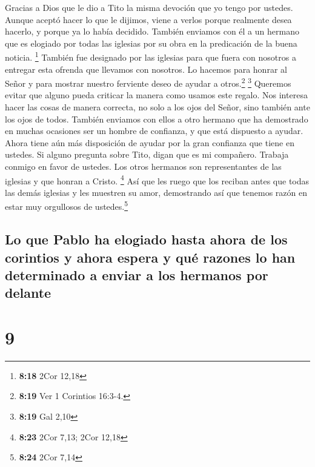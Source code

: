  Gracias a Dios que le dio a Tito la misma devoción que
yo tengo por ustedes.  Aunque aceptó hacer lo que le
dijimos, viene a verlos porque realmente desea hacerlo, y porque ya lo
había decidido.  También enviamos con él a un hermano que
es elogiado por todas las iglesias por su obra en la predicación de la
buena noticia. \footnote{\textbf{8:18} 2Cor 12,18} 
También fue designado por las iglesias para que fuera con nosotros a
entregar esta ofrenda que llevamos con nosotros. Lo hacemos para honrar
al Señor y para mostrar nuestro ferviente deseo de ayudar a
otros.\footnote{\textbf{8:19} Ver 1 Corintios 16:3-4.} \footnote{\textbf{8:19}
  Gal 2,10}  Queremos evitar que alguno pueda criticar la
manera como usamos este regalo.  Nos interesa hacer las
cosas de manera correcta, no solo a los ojos del Señor, sino también
ante los ojos de todos.  También enviamos con ellos a
otro hermano que ha demostrado en muchas ocasiones ser un hombre de
confianza, y que está dispuesto a ayudar. Ahora tiene aún más
disposición de ayudar por la gran confianza que tiene en ustedes.
 Si alguno pregunta sobre Tito, digan que es mi
compañero. Trabaja conmigo en favor de ustedes. Los otros hermanos son
representantes de las iglesias y que honran a Cristo. \footnote{\textbf{8:23}
  2Cor 7,13; 2Cor 12,18}  Así que les ruego que los
reciban antes que todas las demás iglesias y les muestren su amor,
demostrando así que tenemos razón en estar muy orgullosos de
ustedes.\footnote{\textbf{8:24} 2Cor 7,14}

\hypertarget{lo-que-pablo-ha-elogiado-hasta-ahora-de-los-corintios-y-ahora-espera-y-quuxe9-razones-lo-han-determinado-a-enviar-a-los-hermanos-por-delante}{%
\subsection{Lo que Pablo ha elogiado hasta ahora de los corintios y
ahora espera y qué razones lo han determinado a enviar a los hermanos
por
delante}\label{lo-que-pablo-ha-elogiado-hasta-ahora-de-los-corintios-y-ahora-espera-y-quuxe9-razones-lo-han-determinado-a-enviar-a-los-hermanos-por-delante}}

\hypertarget{section-8}{%
\section{9}\label{section-8}}

